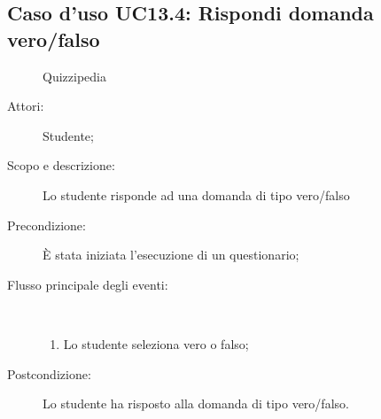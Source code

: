 \subsection{Caso d'uso UC13.4: Rispondi domanda vero/falso}
	\begin{figure}[H]
		\centering
		\begin{resizedtikzpicture}{\textwidth}
		\begin{umlsystem}[x=0, fill=lightgray!20]{Quizzipedia}
		\end{umlsystem}
		\end{resizedtikzpicture}
		\caption{}
	\end{figure}
\begin{description}
\item[Attori:] Studente;
\item[Scopo e descrizione:] Lo studente risponde ad una domanda di tipo vero/falso
      \item[Precondizione:] È stata iniziata l'esecuzione di un questionario;

        \item[Flusso principale degli eventi:] \ 
 \begin{enumerate}
          \item Lo studente seleziona vero o falso;

      \end{enumerate}
    \item[Postcondizione:] Lo studente ha risposto alla domanda di tipo vero/falso.
  \end{description}
\hypertarget{UC13.5}{}
